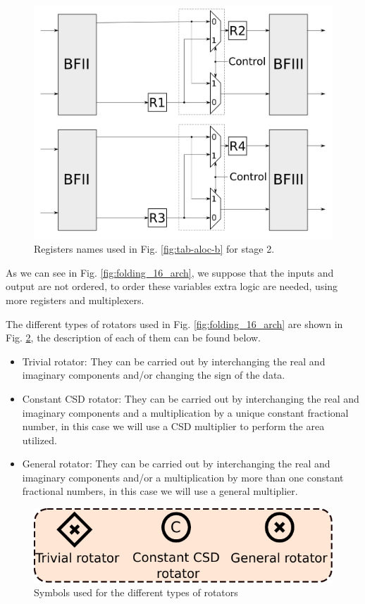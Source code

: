 \documentclass[journal,comsoc]{IEEEtran}
\begin{document}
    \begin{figure} 
        \centering
        \includegraphics[width= 0.85\linewidth]{Diagramas/folding_stage2.png}
        \caption{Registers names used in Fig. \ref{fig:tab-aloc-b} for stage 2.}
        \label{fig:folding16_stage2}
    \end{figure}
        



As we can see in Fig. \ref{fig:folding_16_arch}, we suppose that the inputs and output are not ordered, to order these variables extra logic are needed, using more registers and multiplexers.

The different types of rotators used in Fig. \ref{fig:folding_16_arch} are shown in Fig. \ref{fig:rotators}, the description of each of them can be found below.
\begin{itemize}
	\item Trivial rotator: They can be carried out by interchanging the real and imaginary components and/or changing the sign of the data.
	\item Constant CSD rotator: They can be carried out by interchanging the real and imaginary components and a multiplication by a unique constant fractional number, in this case we will use a CSD multiplier to perform the area utilized.
	\item General rotator: They can be carried out by interchanging the real and imaginary components and/or a multiplication by more than one constant fractional numbers, in this case we will use a general multiplier.
\end{itemize}

\begin{figure} 
	\centering
	\includegraphics[width=0.6\linewidth]{Diagramas/miSeccionFiguras/Rotadores.pdf}
	\caption{Symbols used for the different types of rotators}
	\label{fig:rotators}
\end{figure}
\end{document}
